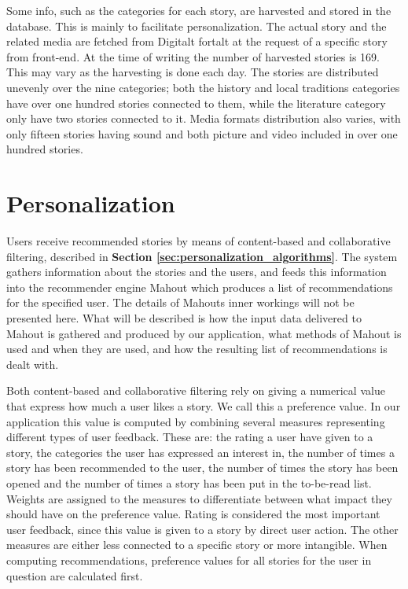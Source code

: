 Some info, such as the categories for each story, are harvested and stored in the database. This is mainly to facilitate personalization. The actual story and the related media are fetched from Digitalt fortalt at the request of a specific story from front-end. At the time of writing the number of harvested stories is 169. This may vary as the harvesting is done each day. The stories are distributed unevenly over the nine categories; both the history and local traditions categories have over one hundred stories connected to them, while the literature category only have two stories connected to it. Media formats distribution also varies, with only fifteen stories having sound and both picture and video included in over one hundred stories.  

\section{Personalization}
\label{sec:personalization_how}

Users receive recommended stories by means of content-based and collaborative filtering, described in \textbf{Section \ref{sec:personalization_algorithms}}. The system gathers information about the stories and the users, and feeds this information into the recommender engine Mahout which produces a list of recommendations for the specified user. The details of Mahouts inner workings will not be presented here. What will be described is how the input data delivered to Mahout is gathered and produced by our application, what methods of Mahout is used and when they are used, and how the resulting list of recommendations is dealt with.\newline

Both content-based and collaborative filtering rely on giving a numerical value that express how much a user likes a story. We call this a preference value. In our application this value is computed by combining several measures representing different types of user feedback. These are: the rating a user have given to a story, the categories the user has expressed an interest in, the number of times a story has been recommended to the user, the number of times the story has been opened and the number of times a story has been put in the to-be-read list. Weights are assigned to the measures to differentiate between what impact they should have on the preference value. Rating is considered the most important user feedback, since this value is given to a story by direct user action. The other measures are either less connected to a specific story or more intangible. When computing recommendations, preference values for all stories for the user in question are calculated first.\newline

